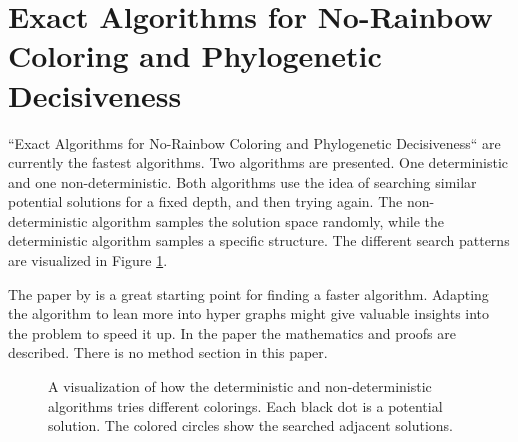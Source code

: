 \documentclass[msc,lith,english]{liuthesis}
\begin{document}
\section{Exact Algorithms for No-Rainbow Coloring and Phylogenetic Decisiveness}
``Exact Algorithms for No-Rainbow Coloring and Phylogenetic Decisiveness`` \cite{sourceNoRainbow}
are currently the fastest algorithms.
Two algorithms are presented. One deterministic and one non-deterministic. Both
algorithms use the idea of searching similar potential solutions for a fixed
depth, and then trying again. The non-deterministic algorithm samples the
solution space randomly, while the deterministic algorithm samples a specific
structure. The different search patterns are visualized in Figure \ref{figNoRainbowSearchPattern}. 

The paper by \citeauthor{sourceNoRainbow} \cite{sourceNoRainbow} is a great starting point for finding a faster algorithm.
Adapting the algorithm to lean more into hyper graphs might give valuable insights into the problem to speed it up.
In the paper the mathematics and proofs are described. There is no method section in this paper.

\begin{center}
\begin{figure}[h]
\centering
{}
  \caption{A visualization of how the deterministic and non-deterministic algorithms tries different colorings. Each black dot is a potential solution. The colored circles show the searched adjacent solutions.}
  \label{figNoRainbowSearchPattern}
\end{figure}
\end{center}
\end{document}
